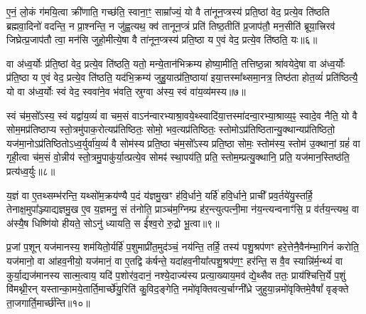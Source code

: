 ए॒नं॒ लो॒कं ग॑मयि॒त्वा क्री॑णाति॒ गच्छ॑ति॒ स्वाना॒ꣳ॒ साम्रा᳚ज्यं॒ यो वै ता॑नून॒प्त्रस्य॑ प्रति॒ष्ठां वेद॒ प्रत्ये॒व ति॑ष्ठति ब्रह्मवा॒दिनो॑ वदन्ति॒ न प्रा॒श्नन्ति॒ न जु॑ह्व॒त्यथ॒ क्व॑ तानून॒प्त्रं प्रति॑ तिष्ठ॒तीति॑ प्र॒जाप॑तौ॒ मन॒सीति॑ ब्रूया॒त्त्रिरव॑ जिघ्रेत्प्र॒जाप॑तौ त्वा॒ मन॑सि जुहो॒मीत्ये॒षा वै ता॑नून॒प्त्रस्य॑ प्रति॒ष्ठा य ए॒वं वेद॒ प्रत्ये॒व ति॑ष्ठति॒ यः॥६॥

वा अ॑ध्व॒र्योः प्र॑ति॒ष्ठां वेद॒ प्रत्ये॒व ति॑ष्ठति॒ यतो॒ मन्ये॒तान॑भिक्रम्य होष्या॒मीति॒ तत्तिष्ठ॒न्ना श्रा॑वयेदे॒षा वा अ॑ध्व॒र्योः प्र॑ति॒ष्ठा य ए॒वं वेद॒ प्रत्ये॒व ति॑ष्ठति॒ यद॑भि॒क्रम्य॑ जुहु॒यात्प्र॑ति॒ष्ठाया॑ इया॒त्तस्मा᳚थ्समा॒नत्र॒ तिष्ठ॑ता होत॒व्यं॑ प्रति॑ष्ठित्यै॒ यो वा अ॑ध्व॒र्योः स्वं वेद॒ स्ववा॑ने॒व भ॑वति॒ स्रुग्वा अ॑स्य॒ स्वं वा॑य॒व्य॑मस्य॥७॥

स्वं च॑म॒सो᳚\-ऽस्य॒ स्वं यद्वा॑य॒व्यं॑ वा चम॒सं वा\-ऽन॑न्वारभ्याश्रा॒वये॒थ्स्वादि॑या॒त्तस्मा॑दन्वा॒रभ्या॒श्राव्य॒ꣴ॒ स्वादे॒व नैति॒ यो वै सोम॒मप्र॑तिष्ठाप्य स्तो॒त्रमु॑पाक॒रोत्यप्र॑तिष्ठितः॒ सोमो॒ भव॒त्यप्र॑तिष्ठितः॒ स्तोमो\-ऽप्र॑तिष्ठितान्यु॒क्थान्यप्र॑तिष्ठितो॒ यज॑मा॒नो\-ऽप्र॑तिष्ठितो\-ऽध्व॒र्युर्वा॑य॒व्यं॑ वै सोम॑स्य प्रति॒ष्ठा च॑म॒सो᳚\-ऽस्य प्रति॒ष्ठा सोमः॒ स्तोम॑स्य॒ स्तोम॑ उ॒क्थानां॒ ग्रहं॑ वा गृही॒त्वा च॑म॒सं वो॒न्नीय॑ स्तो॒त्रमु॒पाकु॑र्या॒त्प्रत्ये॒व सोमꣴ॑ स्था॒पय॑ति॒ प्रति॒ स्तोम॒म्प्रत्यु॒क्थानि॒ प्रति॒ यज॑मान॒स्तिष्ठ॑ति॒ प्रत्य॑ध्व॒र्युः॥८॥

{\anuvakamend[{ए॒व ति॑ष्ठति॒ यो वा॑य॒व्य॑मस्य॒ ग्रहं॒ वैका॒न्नविꣳ॑श॒तिश्च॑॥२॥}]}

य॒ज्ञं वा ए॒तथ्सम्भ॑रन्ति॒ यथ्सो॑म॒क्रय॑ण्यै प॒दं य॑ज्ञमु॒खꣳ ह॑वि॒र्धाने॒ यर्\mbox{}हि॑ हवि॒र्धाने॒ प्राची᳚ प्रव॒र्तये॑यु॒स्तर्\mbox{}हि॒ तेनाक्ष॒मुपा᳚ञ्ज्याद्यज्ञमु॒ख ए॒व य॒ज्ञमनु॒ सं त॑नोति॒ प्राञ्च॑म॒ग्निम्प्र ह॑र॒न्त्युत्पत्नी॒मा न॑य॒न्त्यन्वनाꣳ॑सि॒ प्र व॑र्तय॒न्त्यथ॒ वा अ॑स्यै॒ष धिष्णि॑यो हीयते॒ सो\-ऽनु॑ ध्यायति॒ स ई᳚श्व॒रो रु॒द्रो भू॒त्वा॥९॥

प्र॒जां प॒शून् यज॑मानस्य॒ शम॑यितो॒र्यर्\mbox{}हि॑ प॒शुमाप्री॑त॒मुद॑ञ्चं॒ नय॑न्ति॒ तर्\mbox{}हि॒ तस्य॑ पशु॒श्रप॑णꣳ हरे॒त्तेनै॒वैन॑म्भा॒गिनं॑ करोति॒ यज॑मानो॒ वा आ॑हव॒नीयो॒ यज॑मानं॒ वा ए॒तद्वि क॑र्\mbox{}षन्ते॒ यदा॑हव॒नीया᳚त्पशु॒श्रप॑ण॒ꣳ॒ हर॑न्ति॒ स वै॒व स्यान्नि॑र्म॒न्थ्यं॑ वा कुर्या॒द्यज॑मानस्य सात्म॒त्वाय॒ यदि॑ प॒शोर॑व॒दानं॒ नश्ये॒दाज्य॑स्य प्रत्या॒ख्याय॒मव॑ द्ये॒थ्सैव ततः॒ प्राय॑श्चित्ति॒र्ये प॒शुं वि॑मथ्नी॒रन् यस्तान्का॒मये॒तार्ति॒मार्च्छे॑यु॒रिति॑ कु॒विद॒ङ्गेति॒ नमो॑वृक्तिवत्य॒र्चाग्नी᳚ध्रे जुहुया॒न्नमो॑वृक्तिमे॒वैषां᳚ वृङ्क्ते ता॒जगार्ति॒मार्च्छ॑न्ति॥१०॥

{\anuvakamend[{भू॒त्वा तत॒ष्षड्विꣳ॑शतिश्च॥३॥}]}

